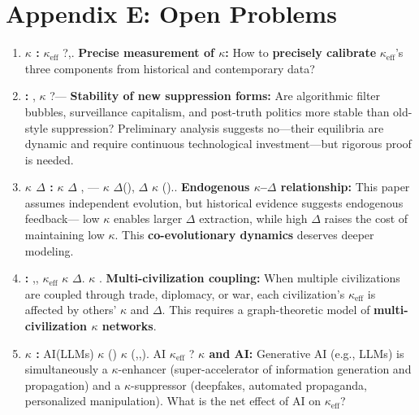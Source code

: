 \documentclass[11pt,a4paper]{article}
\theoremstyle{definition}
\newcommand{\coupling}{\kappa}
\begin{document}
\section{Appendix E: Open Problems}
\begin{enumerate}
 \item \textbf{$\coupling$ : } 
 $\coupling_{\text{eff}}$ ?,.
 \textbf{Precise measurement of $\coupling$:} How to \textbf{precisely calibrate}
 $\coupling_{\text{eff}}$'s three components from historical and contemporary data?
 \item \textbf{: }, 
 $\coupling$ ?---
 \textbf{Stability of new suppression forms:} Are algorithmic filter bubbles,
 surveillance capitalism, and post-truth politics more stable than old-style
 suppression? Preliminary analysis suggests no---their equilibria are dynamic
 and require continuous technological investment---but rigorous proof is needed.
 \item \textbf{$\coupling$ $\Delta$ : } $\coupling$ $\Delta$
, --- $\coupling$ 
 $\Delta$(), $\Delta$ $\coupling$ 
 ()..
 \textbf{Endogenous $\coupling$--$\Delta$ relationship:} This paper assumes
 independent evolution, but historical evidence suggests endogenous feedback---
 low $\coupling$ enables larger $\Delta$ extraction, while high $\Delta$ raises
 the cost of maintaining low $\coupling$. This \textbf{co-evolutionary dynamics}
 deserves deeper modeling.
 \item \textbf{: },, 
 $\coupling_{\text{eff}}$ $\coupling$ $\Delta$.
 \textbf{ $\coupling$ }.
 \textbf{Multi-civilization coupling:} When multiple civilizations are coupled
 through trade, diplomacy, or war, each civilization's $\coupling_{\text{eff}}$
 is affected by others' $\coupling$ and $\Delta$. This requires a graph-theoretic
 model of \textbf{multi-civilization $\coupling$ networks}.
 \item \textbf{$\coupling$ : } AI(LLMs)
 $\coupling$ ()
 $\coupling$ (,,).
 AI $\coupling_{\text{eff}}$ ?
 \textbf{$\coupling$ and AI:} Generative AI (e.g., LLMs) is simultaneously
 a $\coupling$-enhancer (super-accelerator of information generation and
 propagation) and a $\coupling$-suppressor (deepfakes, automated propaganda,
 personalized manipulation). What is the net effect of AI on $\coupling_{\text{eff}}$?
\end{enumerate}
\end{document}
